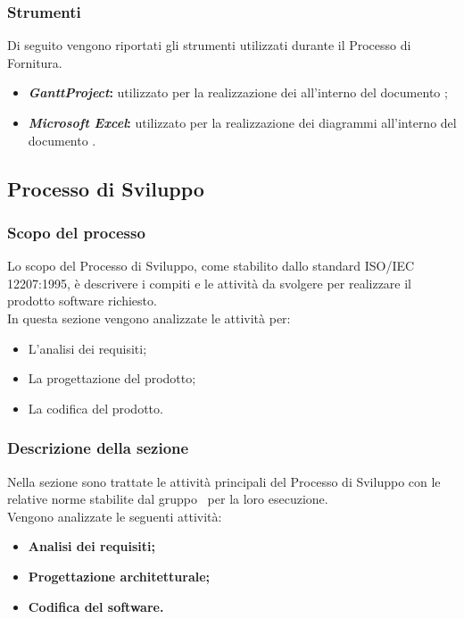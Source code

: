 \subsubsection{Strumenti}\label{PF_Strumenti}
Di seguito vengono riportati gli strumenti utilizzati durante il Processo di Fornitura.
\begin{itemize}
	\item \textbf{\textit{GanttProject}:} utilizzato per la realizzazione dei  all'interno del documento ;
	\item \textbf{\textit{Microsoft Excel}:} utilizzato per la realizzazione dei diagrammi all'interno del documento .
\end{itemize}

\newpage

\subsection{Processo di Sviluppo}
\subsubsection{Scopo del processo}\label{PS_Scopo}
Lo scopo del Processo di Sviluppo, come stabilito dallo standard ISO/IEC 12207:1995, è descrivere i compiti e le attività da svolgere per realizzare il prodotto software richiesto.\\
In questa sezione vengono analizzate le attività per:
\begin{itemize}
	\item L'analisi dei requisiti;
	\item La progettazione del prodotto;
	\item La codifica del prodotto.
\end{itemize}

\subsubsection{Descrizione della sezione} 
Nella sezione sono trattate le attività principali del Processo di Sviluppo con le relative norme stabilite dal gruppo \Gruppo\ per la loro esecuzione. \\
Vengono analizzate le seguenti attività:
\begin{itemize}
\item \textbf{Analisi dei requisiti;}
\item \textbf{Progettazione architetturale;}
\item \textbf{Codifica del software.}
\end{itemize}


